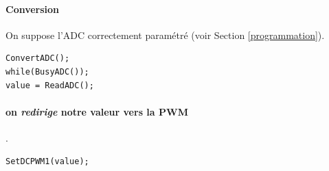 \paragraph{Conversion} On suppose l'ADC correctement paramétré (voir Section \ref{programmation}).
\begin{lstlisting}
ConvertADC();
while(BusyADC());
value = ReadADC();
\end{lstlisting}

\paragraph{on \textit{redirige} notre valeur vers la PWM}.
\begin{lstlisting}
SetDCPWM1(value);
\end{lstlisting}

